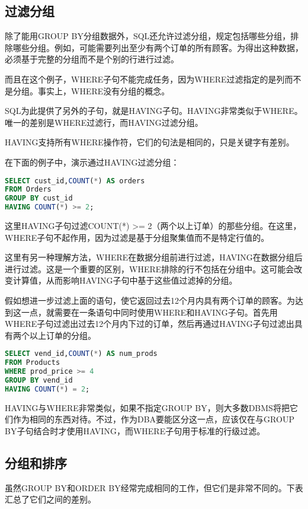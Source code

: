 \subsection{过滤分组}

除了能用GROUP BY分组数据外，SQL还允许过滤分组，规定包括哪些分组，排除哪些分组。例如，可能需要列出至少有两个订单的所有顾客。为得出这种数据，必须基于完整的分组而不是个别的行进行过滤。

而且在这个例子，WHERE子句不能完成任务，因为WHERE过滤指定的是列而不是分组。事实上，WHERE没有分组的概念。

SQL为此提供了另外的子句，就是HAVING子句。HAVING非常类似于WHERE。唯一的差别是WHERE过滤行，而HAVING过滤分组。

HAVING支持所有WHERE操作符，它们的句法是相同的，只是关键字有差别。

在下面的例子中，演示通过HAVING过滤分组：

\begin{lstlisting}[language=SQL]
SELECT cust_id,COUNT(*) AS orders
FROM Orders
GROUP BY cust_id
HAVING COUNT(*) >= 2;
\end{lstlisting}

这里HAVING子句过滤COUNT(*) >= 2（两个以上订单）的那些分组。在这里，WHERE子句不起作用，因为过滤是基于分组聚集值而不是特定行值的。

这里有另一种理解方法，WHERE在数据分组前进行过滤，HAVING在数据分组后进行过滤。这是一个重要的区别，WHERE排除的行不包括在分组中。这可能会改变计算值，从而影响HAVING子句中基于这些值过滤掉的分组。

假如想进一步过滤上面的语句，使它返回过去12个月内具有两个订单的顾客。为达到这一点，就需要在一条语句中同时使用WHERE和HAVING子句。首先用WHERE子句过滤出过去12个月内下过的订单，然后再通过HAVING子句过滤出具有两个以上订单的分组。

\begin{lstlisting}[language=SQL]
SELECT vend_id,COUNT(*) AS num_prods
FROM Products
WHERE prod_price >= 4
GROUP BY vend_id
HAVING COUNT(*) = 2;
\end{lstlisting}

HAVING与WHERE非常类似，如果不指定GROUP BY，则大多数DBMS将把它们作为相同的东西对待。不过，作为DBA要能区分这一点，应该仅在与GROUP BY子句结合时才使用HAVING，而WHERE子句用于标准的行级过滤。
\subsection{分组和排序}



虽然GROUP BY和ORDER BY经常完成相同的工作，但它们是非常不同的。下表汇总了它们之间的差别。

